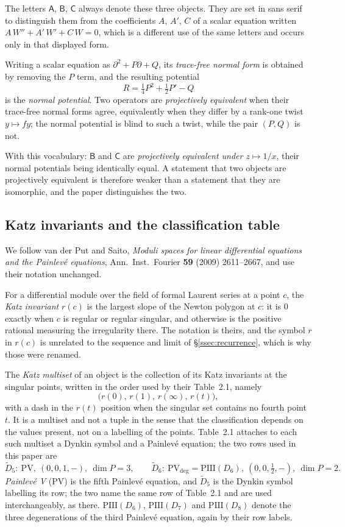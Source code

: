 The letters $\mathsf A$, $\mathsf B$, $\mathsf C$ always denote these three
objects. They are set in sans serif to distinguish them from the coefficients
$A$, $A'$, $C$ of a scalar equation written $A\,W''+A'\,W'+C\,W=0$, which is a
different use of the same letters and occurs only in that displayed form.

Writing a scalar equation as $\partial^2+P\partial+Q$, its \emph{trace-free
normal form} is obtained by removing the $P$ term, and the resulting potential
\[
  R=\tfrac14P^2+\tfrac12P'-Q
\]
is the \emph{normal potential}. Two operators are \emph{projectively
equivalent} when their trace-free normal forms agree, equivalently when they
differ by a rank-one twist $y\mapsto fy$; the normal potential is blind to such
a twist, while the pair $(P,Q)$ is not.

With this vocabulary: $\mathsf B$ and $\mathsf C$ are \emph{projectively
equivalent under $z\mapsto1/x$}, their normal potentials being identically
equal. A statement that two objects are projectively equivalent is therefore
weaker than a statement that they are isomorphic, and the paper distinguishes
the two.

\subsection{Katz invariants and the classification table}\label{ssec:katz}

We follow van der Put and Saito, \emph{Moduli spaces for linear differential
equations and the Painlev\'e equations}, Ann.\ Inst.\ Fourier \textbf{59} (2009)
2611--2667, and use their notation unchanged.

For a differential module over the field of formal Laurent series at a point
$c$, the \emph{Katz invariant} $r(c)$ is the largest slope of the Newton
polygon at $c$: it is $0$ exactly when $c$ is regular or regular singular, and
otherwise is the positive rational measuring the irregularity there. The
notation is theirs, and the symbol $r$ in $r(c)$ is unrelated to the sequence
and limit of \S\ref{ssec:recurrence}, which is why those were renamed.

The \emph{Katz multiset} of an object is the collection of its Katz invariants
at the singular points, written in the order used by their Table~2.1, namely
\[
  \bigl(r(0),\,r(1),\,r(\infty),\,r(t)\bigr),
\]
with a dash in the $r(t)$ position when the singular set contains no fourth
point $t$. It is a multiset and not a tuple in the sense that the classification
depends on the values present, not on a labelling of the points. Table~2.1
attaches to each such multiset a Dynkin symbol and a Painlev\'e equation; the
two rows used in this paper are
\[
  \widetilde D_5:\ \mathrm{PV},\ (0,0,1,-),\ \dim P=3,
  \qquad
  \widetilde D_6:\ \mathrm{PV}_{\deg}=\mathrm{PIII}(D_6),\ (0,0,\tfrac12,-),\
  \dim P=2 .
\]
\emph{Painlev\'e V} (PV) is the fifth Painlev\'e equation, and $\widetilde D_5$
is the Dynkin symbol labelling its row; the two name the same row of Table~2.1
and are used interchangeably, as there. $\mathrm{PIII}(D_6)$, $\mathrm{PIII}(D_7)$
and $\mathrm{PIII}(D_8)$ denote the three degenerations of the third Painlev\'e
equation, again by their row labels.

